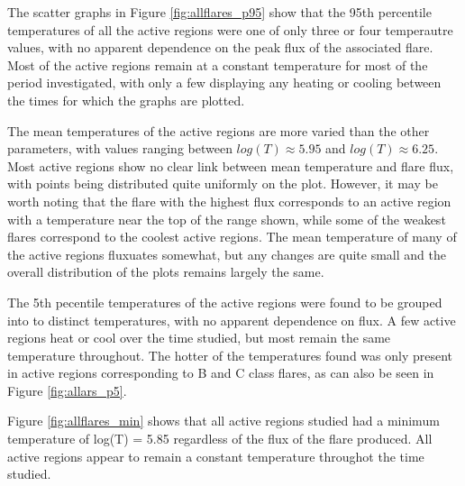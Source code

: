 \documentclass[referee,a4paper,12pt]{swsc}
\begin{document}
\begin{linenumbers}
The scatter graphs in Figure \ref{fig:allflares_p95} show that the 95th percentile temperatures of all the active regions were one of only three or four temperautre values, with no apparent dependence on the peak flux of the associated flare. Most of the active regions remain at a constant temperature for most of the period investigated, with only a few displaying any heating or cooling between the times for which the graphs are plotted.

The mean temperatures of the active regions are more varied than the other parameters, with values ranging between $log(T) \approx 5.95$ and $log(T) \approx 6.25$. 
Most active regions show no clear link between mean temperature and flare flux, with points being distributed quite uniformly on the plot.
However, it may be worth noting that the flare with the highest flux corresponds to an active region with a temperature near the top of the range shown, while some of the weakest flares correspond to the coolest active regions.
The mean temperature of many of the active regions fluxuates somewhat, but any changes are quite small and the overall distribution of the plots remains largely the same.

The 5th pecentile temperatures of the active regions were found to be grouped into to distinct temperatures, with no apparent dependence on flux.
A few active regions heat or cool over the time studied, but most remain the same temperature throughout.
The hotter of the temperatures found was only present in active regions corresponding to B and C class flares, as can also be seen in Figure \ref{fig:allars_p5}.

Figure \ref{fig:allflares_min} shows that all active regions studied had a minimum temperature of log(T) = 5.85 regardless of the flux of the flare produced.
All active regions appear to remain a constant temperature throughot the time studied.


\end{linenumbers}
\end{document}
